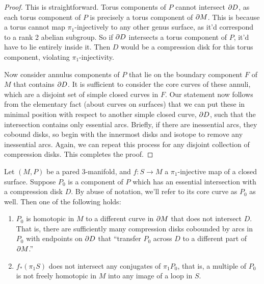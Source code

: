 \begin{proof}

This is straightforward. Torus components of $P$ cannot intersect $\partial D$, as
each torus component of $P$ is precisely a torus component of $\partial M$. This is
because a torus cannot map $\pi_1$-injectively to any other genus surface, as
it'd correspond to a rank 2 abelian subgroup. So if $\partial D$ intersects a torus
component of $P$, it'd have to lie entirely inside it. Then $D$ would be
a compression disk for this torus component, violating $\pi_1$-injectivity.

Now consider annulus components of $P$ that lie on the boundary component $F$
of $M$ that contains $\partial D$. It is sufficient to consider the core curves of
these annuli, which are a disjoint set of simple closed curves in $F$. Our
statement now follows from the elementary fact (about curves on surfaces) that
we can put these in minimal position with respect to another simple closed
curve, $\partial D$, such that the intersection contains only essential arcs.
Briefly, if there are inessential arcs, they cobound disks, so begin with the
innermost disks and isotope to remove any inessential arcs. Again, we can
repeat this process for any disjoint collection of compression disks. This
completes the proof.

\end{proof}

\begin{cor}

Let $(M,P)$ be a pared $3$-manifold, and $f \colon S \to M$ a $\pi_1$-injective
map of a closed surface. Suppose $P_0$ is a component of $P$ which has an
essential intersection with a compression disk $D$. By abuse of notation, we'll
refer to its core curve as $P_0$ as well. Then one of the following holds:

\begin{enumerate}

\item $P_0$ is homotopic in $M$ to a different curve in $\partial M$ that does not
intersect $D$. That is, there are sufficiently many compression disks cobounded
by arcs in $P_0$ with endpoints on $\partial D$ that ``transfer $P_0$ across $D$ to
a different part of $\partial M$.''

\item $f_*(\pi_1S)$ does not intersect any conjugates of $\pi_1 P_0$, that is,
a multiple of $P_0$ is not freely homotopic in $M$ into any image of a loop in
$S$.

\end{enumerate}

\end{cor}


